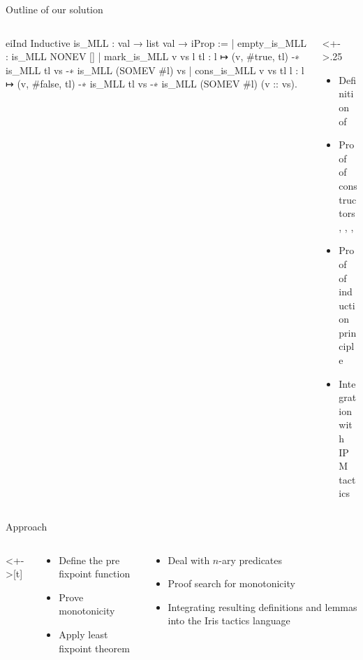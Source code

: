 \documentclass[aspectratio=169]{beamer}
\begin{document}
\begin{frame}[fragile]{Outline of our solution}
    \begin{columns}
        \begin{column}{.75\textwidth}
            \begin{coqcode}
                eiInd
                Inductive is_MLL : val → list val → iProp :=
                    | empty_is_MLL : is_MLL NONEV []
                    | mark_is_MLL v vs l tl : 
                      l ↦ (v, #true, tl) -∗ is_MLL tl vs -∗ 
                      is_MLL (SOMEV #l) vs
                    | cons_is_MLL v vs tl l : 
                      l ↦ (v, #false, tl) -∗ is_MLL tl vs -∗ 
                      is_MLL (SOMEV #l) (v :: vs).
              \end{coqcode}
        \end{column}
        \begin{column}<+->{.25\textwidth}
            \begin{itemize}[<+->]
                \item Definition of 
                \item Proof of constructors, , , 
                \item Proof of induction principle
                \item Integration with IPM tactics
            \end{itemize}
        \end{column}
    \end{columns}
\end{frame}

\begin{frame}{Approach}
    \begin{columns}<+->[t]
        \begin{column}{.5\textwidth}
            \begin{itemize}[<+->]
                \item Define the pre fixpoint function
                \item Prove monotonicity
                \item Apply least fixpoint theorem
            \end{itemize}
        \end{column}
        \begin{column}{.5\textwidth}
            \begin{itemize}[<+->]
                \item Deal with $n$-ary predicates
                \item Proof search for monotonicity
                \item Integrating resulting definitions and lemmas into the Iris tactics language
            \end{itemize}
        \end{column}
    \end{columns}
\end{frame}
\end{document}
